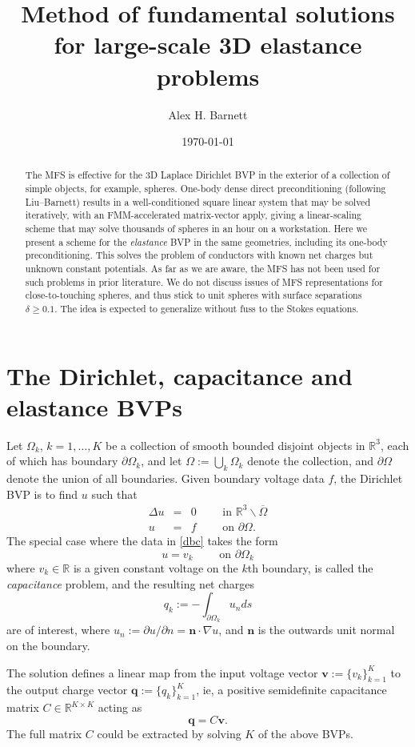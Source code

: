 \documentclass[10pt]{article}
\newcommand{\be}{\begin{equation}}
\newcommand{\ee}{\end{equation}}
\newcommand{\bea}{\begin{eqnarray}}
\newcommand{\eea}{\end{eqnarray}}
\newcommand{\R}{\mathbb{R}}
\newcommand{\vv}{\mathbf{v}}
\newcommand{\qq}{\mathbf{q}}
\newcommand{\n}{\mathbf{n}}
\newcommand{\E}{\R^3\backslash\overline{\Omega}}    %
\newcommand{\pO}{\partial\Omega}
\begin{document}
\title{Method of fundamental solutions for large-scale 3D elastance problems}
\author{Alex H. Barnett}
\date{\today}
\maketitle
\begin{abstract}
  The MFS is effective for the 3D Laplace Dirichlet BVP in the
  exterior of a collection of simple objects, for example, spheres.
  One-body dense direct preconditioning (following
  Liu--Barnett) results in a
  well-conditioned square linear system that may be solved iteratively,
  with an FMM-accelerated matrix-vector apply,
  giving a linear-scaling scheme that may solve thousands of spheres
  in an hour on a workstation.
  Here we present a scheme for the {\em elastance} BVP in the same
  geometries, including its one-body preconditioning.
  This solves the problem of conductors with known net charges
  but unknown constant potentials.
  As far as we are aware, the MFS has not been used for such problems
  in prior literature.
  We do not discuss issues of MFS representations for
  close-to-touching spheres, and thus stick to unit spheres with surface
  separations $\delta \ge 0.1$.
  The idea is expected to generalize without fuss to the Stokes equations.
\end{abstract}

\section{The Dirichlet, capacitance and elastance BVPs}

Let $\Omega_k$, $k=1,\dots,K$ be a collection of smooth bounded
disjoint objects in $\R^3$,
each of which has boundary $\pO_k$,
and let $\Omega := \bigcup_k \Omega_k$ denote the collection,
and $\pO$ denote the union of all boundaries.
Given boundary voltage data $f$, the  Dirichlet BVP is to find $u$
such that
\bea
\Delta u &=& 0 \qquad \mbox{ in } \E
\label{pde}
\\
u &=& f\qquad\mbox{ on } \pO.
\label{dbc}
\eea
The special case where the data in \eqref{dbc} takes the form
\be
u = v_k\qquad\mbox{ on } \pO_k
\label{vk}
\ee
where $v_k\in\R$ is a given constant voltage on the $k$th boundary,
is called the {\em capacitance} problem,
and the resulting net charges
\be
q_k := -\int_{\pO_k} u_n ds
\label{qk}
\ee
are of interest,
where $u_n:=\partial u/\partial n = \n\cdot \nabla u$,
and $\n$ is the outwards unit normal on the boundary.

The solution defines a linear map from the input voltage vector
$\vv := \{v_k\}_{k=1}^K$ to the output charge vector $\qq := \{q_k\}_{k=1}^K$,
ie, a positive semidefinite capacitance matrix $C\in \R^{K\times K}$ acting as
\be
\qq = C \vv.
\ee
The full matrix $C$ could be extracted by solving $K$ of the above BVPs.
\end{document}
